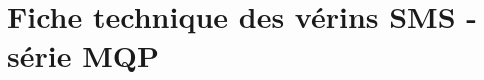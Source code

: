 

\lhead[\fancyplain{}{\leftmark}]%
      {\fancyplain{}{}} %
\chead[\fancyplain{}{}]%
      {\fancyplain{}{}}
\rhead[\fancyplain{}{}]%
      {\fancyplain{}{\rightmark}}%
\lfoot[\fancyplain{}{}]%
      {\fancyplain{}{}}
\cfoot[\fancyplain{}{\thepage}]%
      {\fancyplain{}{\thepage}} %
\rfoot[\fancyplain{}{}]%
     {\fancyplain{}{\scriptsize}}



\chapter{Fiche technique des vérins SMS - série MQP}
\label{Ann:2_Vérin SMC série MQP}

\minitoc
\newpage

